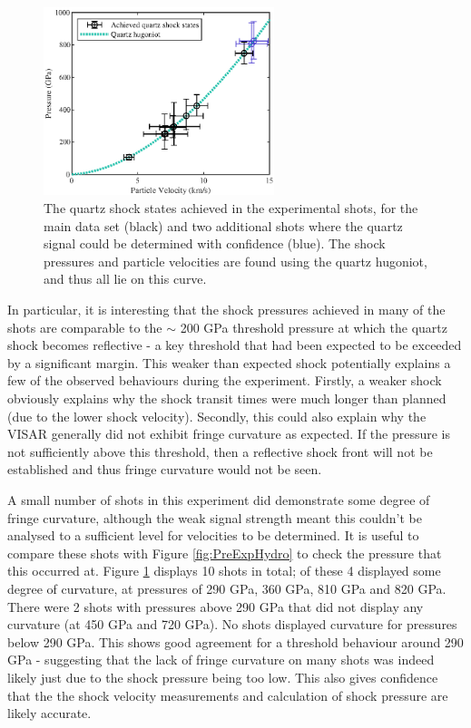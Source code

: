 \begin{figure} [h]
\begin{centering}
\includegraphics[width=0.6\textwidth]{figures/Experiment/QuartzShockStates_edit.eps}%
\caption{\label{fig:QuartzShockStates} The quartz shock states achieved in the experimental shots, for the main data set (black) and two additional shots where the quartz signal could be determined with confidence (blue). The shock pressures and particle velocities are found using the quartz hugoniot, and thus all lie on this curve.}
\end{centering}
\end{figure}

In particular, it is interesting that the shock pressures achieved in many of the shots are comparable to the $\sim$ 200 GPa threshold pressure at which the quartz shock becomes reflective - a key threshold that had been expected to be exceeded by a significant margin. This weaker than expected shock potentially explains a few of the observed behaviours during the experiment. Firstly, a weaker shock obviously explains why the shock transit times were much longer than planned (due to the lower shock velocity). Secondly, this could also explain why the VISAR generally did not exhibit fringe curvature as expected. If the pressure is not sufficiently above this threshold, then a reflective shock front will not be established and thus fringe curvature would not be seen.

A small number of shots in this experiment did demonstrate some degree of fringe curvature, although the weak signal strength meant this couldn't be analysed to a sufficient level for velocities to be determined. It is useful to compare these shots with Figure \ref{fig:PreExpHydro} to check the pressure that this occurred at. Figure \ref{fig:QuartzShockStates} displays 10 shots in total; of these 4 displayed some degree of curvature, at pressures of 290 \unit{\giga\pascal}, 360 \unit{\giga\pascal}, 810 \unit{\giga\pascal} and 820 \unit{\giga\pascal}. There were 2 shots with pressures above 290 \unit{\giga\pascal} that did not display any curvature (at 450 \unit{\giga\pascal} and 720 \unit{\giga\pascal}). No shots displayed curvature for pressures below 290 \unit{\giga\pascal}. This shows good agreement for a threshold behaviour around 290 \unit{\giga\pascal} - suggesting that the lack of fringe curvature on many shots was indeed likely just due to the shock pressure being too low. This also gives confidence that the the shock velocity measurements and calculation of shock pressure are likely accurate.

